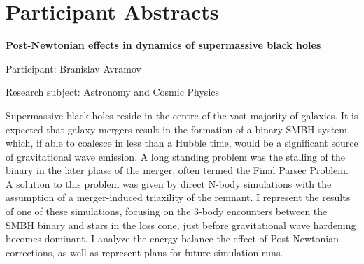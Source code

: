 
\section*{Participant Abstracts}

\begin{minipage}[t]{1.0\textwidth}

\begin{center}

{{\large\bfseries Post-Newtonian effects in dynamics of supermassive black holes}\par}

\end{center}

{\noindent Participant: Branislav Avramov\par} 

{\noindent Research subject: Astronomy and Cosmic Physics\par}\medskip

\noindent Supermassive black holes reside in the centre of the vast majority of galaxies. It is expected that galaxy mergers result in the formation of a binary SMBH system, which, if able to coalesce in less than a Hubble time, would be a significant source of gravitational wave emission. A long standing problem was the stalling of the binary in the later phase of the merger, often termed the Final Parsec Problem. A solution to this problem was given by direct N-body simulations with the assumption of a merger-induced triaxility of the remnant. I represent the results of one of these simulations, focusing on the 3-body encounters between the SMBH binary and stars in the loss cone, just before gravitational wave hardening becomes dominant. I analyze the energy balance the effect of Post-Newtonian corrections, as well as represent plans for future simulation runs.  
\par\end{minipage}

\hfill 

